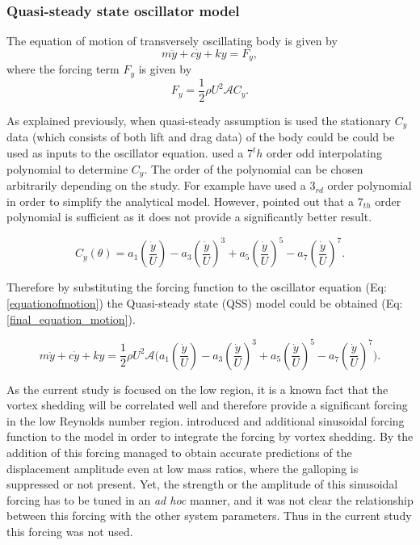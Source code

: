

\subsubsection*{Quasi-steady state oscillator model}

The equation of motion of transversely oscillating body is given by 
\begin{equation}
\label{equationofmotion}
m\ddot{y}+c\dot{y}+ky=F_y,
\end{equation}
where the forcing term $F_y$ is given by
\begin{equation}
\label{lift equation}
F_y=\frac{1}{2}\rho U^2\mathcal{A}C_y.
\end{equation}

As explained previously, when quasi-steady assumption is used the stationary $C_y$ data (which consists of both lift and drag data)  of the body could be could be used as inputs to the oscillator equation.\citet{Parkinson1964} used a $7^th$ order odd interpolating polynomial to determine $C_y$. The order of the polynomial can be chosen arbitrarily depending on the study. For example \citet{Barrero-Gil2009,Barrero-Gil2010a} have used a $3_{rd}$ order polynomial in order to simplify the analytical model. However, \citet{Ng2005} pointed out that a $7_{th}$ order polynomial is sufficient as it does not provide a significantly better result.    

\begin{equation}
\label{cy ploynomial}
C_y(\theta)=a_1\left(\frac{\dot{y}}{U}\right)-a_3\left(\frac{\dot{y}}{U}\right)^3+a_5\left(\frac{\dot{y}}{U}\right)^5-a_7\left(\frac{\dot{y}}{U}\right)^7.
\end{equation}

Therefore by substituting the forcing function to the oscillator equation (Eq:\ref{equationofmotion}) the Quasi-steady state (QSS) model could be obtained (Eq:\ref{final_equation_motion}). 

\begin{equation}
\label{final_equation_motion}
m\ddot{y}{+}c\dot{y}{+}ky{=}\frac{1}{2}\rho U^2 \mathcal {A} \Bigg(a_1\left(\frac{\dot{y}}{U}\right){-}a_3\left(\frac{\dot{y}}{U}\right)^3{+}a_5\left(\frac{\dot{y}}{U}\right)^5{-}a_7\left(\frac{\dot{y}}{U}\right)^7 \Bigg).
\end{equation}

As the current study is focused on the low \reynoldsnumber region, it is a known fact that the vortex shedding will be correlated well and therefore provide a significant forcing in the low Reynolds number region. \citet{Joly2012} introduced and additional sinusoidal forcing function to the model in order to integrate the forcing by vortex shedding. By the addition of this forcing \citet{Joly2012} managed to obtain accurate predictions of the displacement amplitude even at low mass ratios, where the galloping is suppressed or not present. Yet, the strength or the amplitude of this sinusoidal forcing has to be tuned in an \emph{ad hoc} manner, and it was not clear the relationship between this forcing with the other system parameters. Thus in the current study this forcing was not used.

